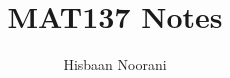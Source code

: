\documentclass[12pt]{article}
\title{MAT137 Notes}
\author{Hisbaan Noorani}
\begin{document}
\maketitle{}















\end{document}
